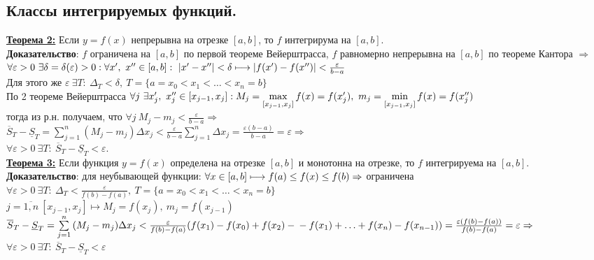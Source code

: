 \documentclass[a4paper,12pt]{article} %
\begin{document}
\subsection{Классы интегрируемых функций.}


\underline{\textbf{Теорема 2:}} Если $y=f(x)$ непрерывна на отрезке $[a,b]$, то $f$ интегрирума на $[a,b]$.\\

\textbf{Доказательство}: $f$ ограничена на $[a,b]$ по первой теореме Вейерштрасса, $f$ равномерно непрерывна на $[a,b]$ по теореме Кантора $\Rightarrow$\\
$\forall\varepsilon>0~\exists\delta=\delta(\varepsilon)>0: \forall x^{\prime},~x^{\prime\prime} \in [a,b]:~|x^{\prime}-x^{\prime\prime}|<\delta \longmapsto\\|f(x^{\prime})-f(x^{\prime\prime})|<\frac{\varepsilon}{b-a}$\\
Для этого же $\varepsilon~\exists T:~\Delta_T<\delta,~T=\{a=x_0<x_1<{\dots}<x_n=b\}$\\
По 2 теореме Вейерштрасса $\forall j~\exists x^{\prime}_j,~x^{\prime\prime}_j\in [x_{j-1},x_j]:~\\
M_j=\max\limits_{[x_{j-1},x_j]}{f(x)}=f(x^{\prime}_j),~m_j=\min\limits_{[x_{j-1},x_j]}{f(x)}=f(x^{\prime\prime}_j)$\\
тогда из р.н. получаем, что $\forall j~M_j-m_j<\frac{\varepsilon}{b-a}\Rightarrow$\\
$\overline{S}_T-\underline{S}_T=\sum\limits^{n}_{j=1}{(M_j-m_j)\Delta x_j}<\frac{\varepsilon}{b-a}\sum\limits^{n}_{j=1}{\Delta x_j}=\frac{\varepsilon(b-a)}{b-a}=\varepsilon\Rightarrow$\\
$\forall\varepsilon>0~\exists T:~\overline{S}_T-\underline{S}_T<\varepsilon$.\\


\underline{\textbf{Теорема 3:}} Если функция $y=f(x)$ определена на отрезке $[a,b]$ и монотонна на отрезке, то $f$ интегрируема на $[a,b]$.\\

\textbf{Доказательство}: для неубывающей функции: $\forall x\in[a,b]\longmapsto\\
f(a)\leq f(x) \leq f(b)\Rightarrow$ ограничена\\
$\forall\varepsilon>0~\exists T:~\Delta_T<\frac{\varepsilon}{f(b)-f(a)},~T=\{a=x_0<x_1<{\dots}<x_n=b\}$\\
$j=\overline{1,n}~[x_{j-1},x_j]\longmapsto
M_j=f(x_j),~m_j=f(x_{j-1})$\\
$\overline{S}_T-\underline{S}_T=\sum\limits^{n}_{j=1}{(M_j-m_j)\Delta x_j}<\frac{\varepsilon}{f(b)-f(a)}(f(x_1)-f(x_0)+f(x_2)-\\
-f(x_1)+{\dots}+f(x_n)-f(x_{n-1}))=\frac{\varepsilon(f(b)-f(a))}{f(b)-f(a)}=\varepsilon\Rightarrow$\\
$\forall\varepsilon>0~\exists T:~\overline{S}_T-\underline{S}_T<\varepsilon$\\
\end{document}
